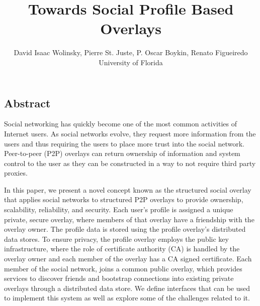 \documentclass[letterpaper,twocolumn,10pt]{article}
\begin{document}
\title{\Large \bf Towards Social Profile Based Overlays}

\author{
David Isaac Wolinsky,
Pierre St. Juste,
P. Oscar Boykin,
Renato Figueiredo
\\
University of Florida
\\
}




\subsection*{Abstract}
Social networking has quickly become one of the most common activities of
Internet users. As social networks evolve, they request more information from
the users and thus requiring the users to place more trust into the social
network. Peer-to-peer (P2P) overlays can return ownership of information and
system control to the user as they can be constructed in a way to not require
third party proxies.

In this paper, we present a novel concept known as the structured social overlay
that applies social networks to structured P2P overlays to provide ownership,
scalability, reliability, and security. Each user's profile is assigned a
unique private, secure overlay, where members of that overlay have a friendship
with the overlay owner. The profile data is stored using the profile overlay's
distributed data stores. To ensure privacy, the profile overlay employs the
public key infrastructure, where the role of certificate authority (CA) is
handled by the overlay owner and each member of the overlay has a CA signed
certificate. Each member of the social network, joins a common public overlay,
which provides services to discover friends and bootstrap connections into
existing private overlays through a distributed data store. We define interfaces
that can be used to implement this system as well as explore some of the
challenges related to it.
\end{document}
